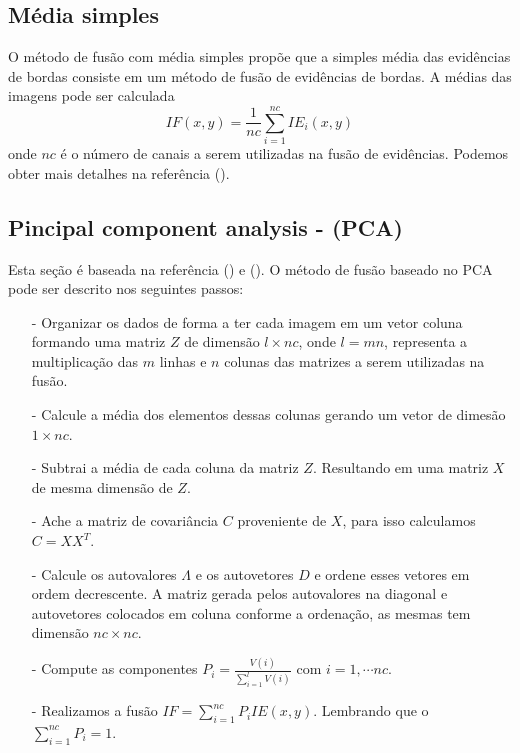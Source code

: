 \documentclass[conference]{IEEEtran}
\begin{document}
\subsection{Média simples}
O método de fusão com média simples propõe que a simples média das evidências de bordas consiste em um método de fusão de evidências de bordas. A médias das imagens pode ser calculada
\begin{equation}
	IF(x,y)=\frac{1}{nc}\sum_{i=1}^{nc}IE_i(x,y)
\end{equation}
onde $nc$ é o número de canais a serem utilizadas na fusão de evidências. Podemos obter mais detalhes na referência (\cite{mit}).
\subsection{Pincipal component analysis - (PCA) }
Esta seção é baseada na referência (\cite{n_r}) e (\cite{mit}). O método de fusão baseado no PCA pode ser descrito nos seguintes passos:
\begin{itemize}
\item[-] Organizar os dados de forma a ter cada imagem em um vetor coluna formando uma matriz $Z$ de dimensão $l\times nc$, onde $l=mn$, representa a multiplicação das $m$ linhas e $n$ colunas das matrizes a serem utilizadas na fusão.
\item[-] Calcule a média dos elementos dessas colunas gerando um vetor de dimesão $1\times nc$.
\item[-] Subtrai a média de cada coluna da matriz $Z$. Resultando em uma matriz $X$ de mesma dimensão de $Z$. 
\item[-] Ache a matriz de covariância $C$ proveniente de $X$, para isso calculamos $C=XX^T$.
\item[-] Calcule os autovalores $\Lambda$ e os autovetores $D$ e ordene esses vetores em ordem decrescente. A matriz gerada pelos autovalores na diagonal e autovetores colocados em coluna conforme a ordenação, as mesmas tem dimensão $nc\times nc$.
\item[-] Compute as componentes $P_i=\frac{V(i)}{\sum_{i=1}^l V(i)}$ com $i=1,\cdots nc$.
\item[-] Realizamos a fusão $IF=\sum_{i=1}^{nc}P_iIE(x,y)$. Lembrando que o $\sum_{i=1}^{nc}P_i=1$.  
\end{itemize}
\end{document}
